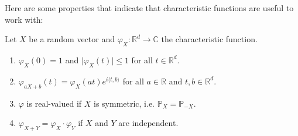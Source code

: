 Here are some properties that indicate that characteristic functions are useful to work with:
\begin{llemma}
\begin{lemma}\label{lemma_5111}
	Let $X$ be a random vector and $\varphi_X \colon \mathbb{R}^d \to \mathbb{C}$ the characteristic function.
	\begin{enumerate}[label=(\roman*)]
		\item $\varphi_X(0) = 1$ and $\lvert \varphi_X(t) \rvert \leq 1$ for all $t \in \mathbb{R}^d$.
		\item $\varphi_{aX+b}(t) = \varphi_X(a t)  e^{i\langle t,b \rangle}$ for all $ a \in \mathbb{R}$ and $t, b\in \mathbb{R}^d$.
		\item $\varphi$ is real-valued if $X$ is symmetric, i.e. $\mathbb{P}_X = \mathbb{P}_{-X}$.
		\item $\varphi_{X+Y} = \varphi_X \cdot \varphi_Y$ if $X$ and $Y$ are independent.
	\end{enumerate}
\end{lemma}
\end{llemma}
